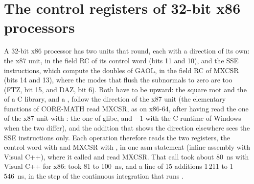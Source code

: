 \documentclass[12pt,a4paper,twoside,openright]{book}
\begin{document}
\section{The control registers of 32-bit x86 processors}
\label{sec:x86-control-registers}
%

A 32-bit x86 processor has two units that round, each with a direction of its
own: the x87 unit, in the field RC of its control word (bits 11 and 10), and
the SSE instructions, which compute the doubles of GAOL, in the field RC of
MXCSR (bits 14 and 13), where the modes that flush the subnormals to zero are
too (FTZ, bit 15, and DAZ, bit 6). Both have to be upward: the square root
and the  of a C library, and a , follow the
direction of the x87 unit (the elementary functions of CORE-MATH read MXCSR,
as on x86-64, after having read the one of the x87 unit with
: the one of glibc, and $-1$ with the C runtime of Windows
when the two differ), and the addition that shows the direction elsewhere
sees the SSE instructions only. Each operation therefore reads the two
registers, the control word with  and MXCSR with
, in one asm statement (inline assembly with Visual C++), where
it called  and read MXCSR.\newinvfive{} That call took
about 80~ns with Visual C++ for x86:  took 81 to 100~ns, and a
line of 15 additions 1\,211 to 1\,546~ns, in the step of the continuous
integration that runs .
\end{document}
